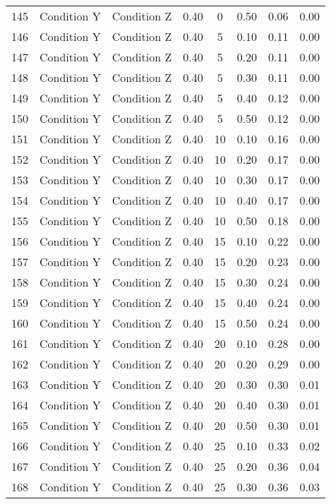 \begin{landscape}
\begin{longtable}{cc cc cc cc}
  145 & Condition Y & Condition Z & 0.40 &   0 & 0.50 & 0.06 & 0.00 \\ 
  146 & Condition Y & Condition Z & 0.40 &   5 & 0.10 & 0.11 & 0.00 \\ 
  147 & Condition Y & Condition Z & 0.40 &   5 & 0.20 & 0.11 & 0.00 \\ 
  148 & Condition Y & Condition Z & 0.40 &   5 & 0.30 & 0.11 & 0.00 \\ 
  149 & Condition Y & Condition Z & 0.40 &   5 & 0.40 & 0.12 & 0.00 \\ 
  150 & Condition Y & Condition Z & 0.40 &   5 & 0.50 & 0.12 & 0.00 \\ 
  151 & Condition Y & Condition Z & 0.40 &  10 & 0.10 & 0.16 & 0.00 \\ 
  152 & Condition Y & Condition Z & 0.40 &  10 & 0.20 & 0.17 & 0.00 \\ 
  153 & Condition Y & Condition Z & 0.40 &  10 & 0.30 & 0.17 & 0.00 \\ 
  154 & Condition Y & Condition Z & 0.40 &  10 & 0.40 & 0.17 & 0.00 \\ 
  155 & Condition Y & Condition Z & 0.40 &  10 & 0.50 & 0.18 & 0.00 \\ 
  156 & Condition Y & Condition Z & 0.40 &  15 & 0.10 & 0.22 & 0.00 \\ 
  157 & Condition Y & Condition Z & 0.40 &  15 & 0.20 & 0.23 & 0.00 \\ 
  158 & Condition Y & Condition Z & 0.40 &  15 & 0.30 & 0.24 & 0.00 \\ 
  159 & Condition Y & Condition Z & 0.40 &  15 & 0.40 & 0.24 & 0.00 \\ 
  160 & Condition Y & Condition Z & 0.40 &  15 & 0.50 & 0.24 & 0.00 \\ 
  161 & Condition Y & Condition Z & 0.40 &  20 & 0.10 & 0.28 & 0.00 \\ 
  162 & Condition Y & Condition Z & 0.40 &  20 & 0.20 & 0.29 & 0.00 \\ 
  163 & Condition Y & Condition Z & 0.40 &  20 & 0.30 & 0.30 & 0.01 \\ 
  164 & Condition Y & Condition Z & 0.40 &  20 & 0.40 & 0.30 & 0.01 \\ 
  165 & Condition Y & Condition Z & 0.40 &  20 & 0.50 & 0.30 & 0.01 \\ 
  166 & Condition Y & Condition Z & 0.40 &  25 & 0.10 & 0.33 & 0.02 \\ 
  167 & Condition Y & Condition Z & 0.40 &  25 & 0.20 & 0.36 & 0.04 \\ 
  168 & Condition Y & Condition Z & 0.40 &  25 & 0.30 & 0.36 & 0.03 \\ 

\end{longtable}
\end{landscape}
